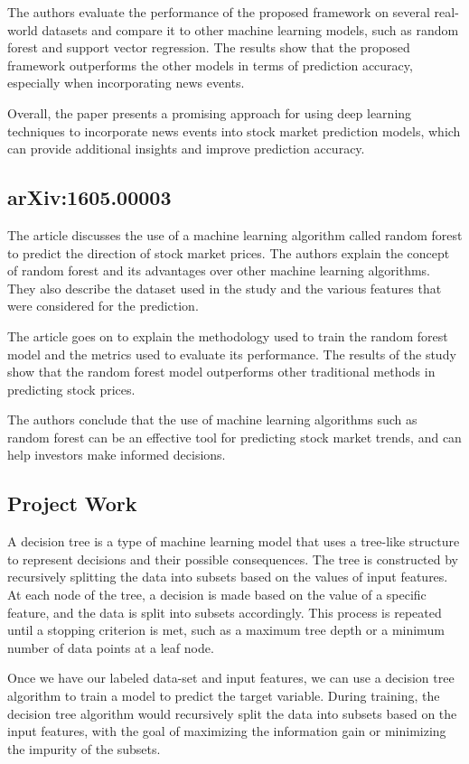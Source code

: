 \documentclass{article}
\begin{document}
The authors evaluate the performance of the proposed framework on several real-world datasets and compare it to other machine learning models, such as random forest and support vector regression. The results show that the proposed framework outperforms the other models in terms of prediction accuracy, especially when incorporating news events.

Overall, the paper presents a promising approach for using deep learning techniques to incorporate news events into stock market prediction models, which can provide additional insights and improve prediction accuracy.


\subsection{arXiv:1605.00003}
The article discusses the use of a machine learning algorithm called random forest to predict the direction of stock market prices. The authors explain the concept of random forest and its advantages over other machine learning algorithms. They also describe the dataset used in the study and the various features that were considered for the prediction.

The article goes on to explain the methodology used to train the random forest model and the metrics used to evaluate its performance. The results of the study show that the random forest model outperforms other traditional methods in predicting stock prices.

The authors conclude that the use of machine learning algorithms such as random forest can be an effective tool for predicting stock market trends, and can help investors make informed decisions.

\subsection{Project Work}
A decision tree is a type of machine learning model that uses a tree-like structure to represent decisions and their possible consequences. The tree is constructed by recursively splitting the data into subsets based on the values of input features. At each node of the tree, a decision is made based on the value of a specific feature, and the data is split into subsets accordingly. This process is repeated until a stopping criterion is met, such as a maximum tree depth or a minimum number of data points at a leaf node.

Once we have our labeled data-set and input features, we can use a decision tree algorithm to train a model to predict the target variable. During training, the decision tree algorithm would recursively split the data into subsets based on the input features, with the goal of maximizing the information gain or minimizing the impurity of the subsets.
\end{document}
